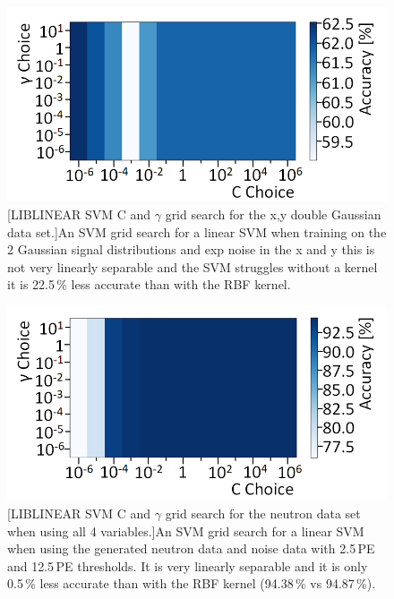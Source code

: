 \begin{figure}[!h]
\centering
\begin{minipage}{.45\textwidth}
  \centering
  \includegraphics[width=\linewidth]{Appendix1/Figs/exp2GaussLinearGridSearch.png}
  [LIBLINEAR SVM C and $\gamma$ grid search for the x,y double Gaussian data set.]{An SVM grid search for a linear SVM when training on the 2 Gaussian signal distributions and exp noise in the x and y this is not very linearly separable and the SVM struggles without a kernel it is 22.5\,\% less accurate than with the RBF kernel.} 
  \label{fig:exp2GaussLinearGridSearch}
\end{minipage}%
\qquad
\begin{minipage}{.45\textwidth}
  \centering
  \includegraphics[width=\linewidth]{Appendix1/Figs/NeutronNoiseLinearGridSearch.png}
  [LIBLINEAR SVM C and $\gamma$ grid search for the neutron data set when using all 4 variables.]{An SVM grid search for a linear SVM when using the generated neutron data and noise data with 2.5\,PE and 12.5\,PE thresholds. It is very linearly separable and it is only 0.5\,\% less accurate than with the RBF kernel (94.38\,\% vs 94.87\,\%).}
  \label{fig:NeutronNoiseLinearGridSearch}
\end{minipage}
\end{figure}

